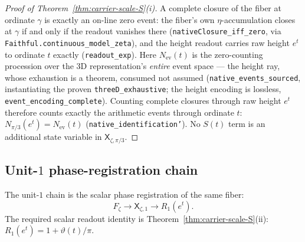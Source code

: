 \documentclass[11pt]{article}
\theoremstyle{definition}
\begin{document}
\begin{proof}[Proof of Theorem~\textup{\ref{thm:carrier-scale-S}(i)}]
A complete closure of the fiber at ordinate \(\gamma\) is exactly an on-line
zero event: the fiber's own \(\eta\)-accumulation closes at \(\gamma\) if and
only if the readout vanishes there (\texttt{nativeClosure\_iff\_zero}, via
\texttt{Faithful.continuous\_model\_zeta}), and the height readout carries raw
height \(e^t\) to ordinate \(t\) exactly (\texttt{readout\_exp}).  Here
\(N_{\mathrm{ev}}(t)\) is the zero-counting procession over the 3D representation's
\emph{entire} event space --- the height ray, whose exhaustion is a theorem,
consumed not assumed (\texttt{native\_events\_sourced}, instantiating the
proven \texttt{threeD\_exhaustive}; the height encoding is lossless,
\texttt{event\_encoding\_complete}).  Counting complete closures through raw
height \(e^t\) therefore counts exactly the arithmetic events through ordinate
\(t\): \(N_{\pi/3}(e^t)=N_{\mathrm{ev}}(t)\)
(\texttt{native\_identification'}).  No
\(S(t)\) term is an additional state variable in \(\mathsf X_{\zeta,\pi/3}\).
\end{proof}

\subsection{\texorpdfstring{Unit-\(1\)}{Unit-1} phase-registration chain}
The unit-\(1\) chain is the scalar phase registration of the same fiber:
\[
F_\zeta
\longrightarrow
\mathsf X_{\zeta,1}
\longrightarrow
R_1(e^t).
\]
The required scalar readout identity is
Theorem~\ref{thm:carrier-scale-S}(ii):
\(R_1(e^t)=1+\vartheta(t)/\pi\).
\end{document}
